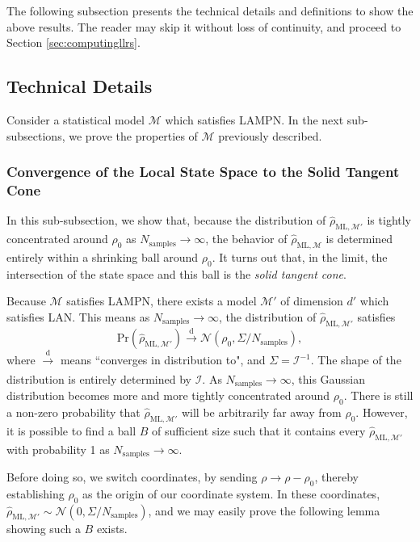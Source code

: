 \documentclass[aps,pra, twocolumn]{revtex4-1}
\newcommand{\M}{\mathcal{M}}
\newcommand{\rhohat}{\hat{\rho}}
\newcommand{\rhoML}[1]{\rhohat_{\scriptscriptstyle{\mathrm{ML},#1}}}
\begin{document}
The following subsection presents the technical details and definitions to show the above results. The reader may skip it without loss of continuity, and proceed to Section \ref{sec:computingllrs}.

\subsection{Technical Details}

Consider a statistical model $\M$ which satisfies LAMPN. In the next sub-subsections, we prove the properties of $\M$ previously described.

\subsubsection{Convergence of the Local State Space to the Solid Tangent Cone}

In this sub-subsection, we show that, because the distribution of $\rhoML{\M'}$ is tightly concentrated around $\rho_{0}$ as $N_{\mathrm{samples}} \rightarrow \infty$, the behavior of $\rhoML{\M}$ is determined entirely within a shrinking ball around $\rho_{0}$. It turns out that, in the limit, the intersection of the state space and this ball is the \emph{solid tangent cone}.

Because $\M$ satisfies LAMPN, there exists a model $\M'$ of dimension $d'$ which satisfies LAN. This means as $N_{\mathrm{samples}} \rightarrow \infty$, the distribution of $\rhoML{\M'}$ satisfies
\[\mathrm{Pr}(\rhoML{\M'})\xrightarrow[]{\text{d}} \mathcal{N}(\rho_{0}, \Sigma/N_{\mathrm{samples}}),\]
where $\xrightarrow[]{\text{d}}$ means ``converges in distribution to", and $\Sigma = \mathcal{I}^{-1}$.
The shape of the distribution is entirely determined by $\mathcal{I}$. As $N_{\mathrm{samples}} \rightarrow \infty$, this Gaussian distribution becomes more and more tightly concentrated around $\rho_{0}$. There is still a non-zero probability that $\rhoML{\M'}$ will be arbitrarily far away from $\rho_{0}$. However, it is possible to find a ball $B$ of sufficient size such that it contains every $\rhoML{\M'}$ with probability 1 as $N_{\mathrm{samples}}\rightarrow \infty$.

Before doing so, we switch coordinates, by sending $\rho \rightarrow \rho - \rho_{0}$, thereby establishing $\rho_{0}$ as the origin of our coordinate system. In these coordinates, $\rhoML{\M'} \sim \mathcal{N}(0, \Sigma/N_{\mathrm{samples}})$, and we may easily prove the following lemma showing such a $B$ exists.
\end{document}
